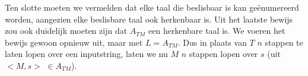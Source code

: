 Ten slotte moeten we vermelden dat elke taal die beslisbaar is kan ge\"enumereerd worden, aangezien elke beslisbare taal ook herkenbaar is. Uit het laatste bewijs zou ook duidelijk moeten zijn dat $A_{TM}$ een herkenbare taal is. We voeren het bewijs gewoon opnieuw uit, maar met $L = A_{TM}$. Dus in plaats van $T$ $n$ stappen te laten lopen over een inputstring, laten we nu $M$ $n$ stappen lopen over $s$ (uit $<M,s>$ $\in A_{TM}$).
